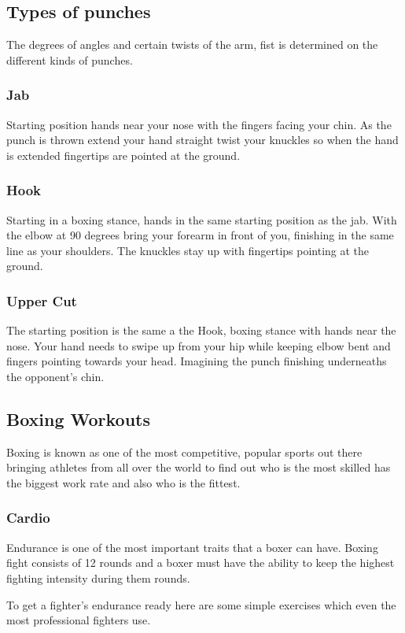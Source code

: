 \documentclass[a4paper,12pt]{report}
\begin{document}
\subsection{Types of punches}
The degrees of angles and certain twists of the arm, fist is determined on the different kinds of punches.
\subsubsection{Jab}
Starting position hands near your nose with the fingers facing your chin.
As the punch is thrown extend your hand straight twist your knuckles so when the hand is extended fingertips are pointed at the ground.

\subsubsection{Hook}
Starting in a boxing stance, hands in the same starting position as the jab.
With the elbow at 90 degrees bring your forearm in front of you, finishing in the same line as your shoulders. The knuckles stay up with fingertips pointing at the ground.

\subsubsection{Upper Cut}
The starting position is the same a the Hook, boxing stance with hands near the nose. 
Your hand needs to swipe up from your hip while keeping elbow bent and fingers pointing towards your head. Imagining the punch finishing underneaths the opponent's chin.\cite{punchingPhysics}

\subsection{Boxing Workouts}
Boxing is known as one of the most competitive, popular sports out there bringing athletes from all over the world to find out who is the most skilled has the biggest work rate and also who is the fittest.

\subsubsection{Cardio}
Endurance is one of the most important traits that a boxer can have. Boxing fight consists of 12 rounds and a boxer must have the ability to keep the highest fighting intensity during them rounds.

To get a fighter's endurance ready here are some simple exercises which even the most professional fighters use.
\end{document}
